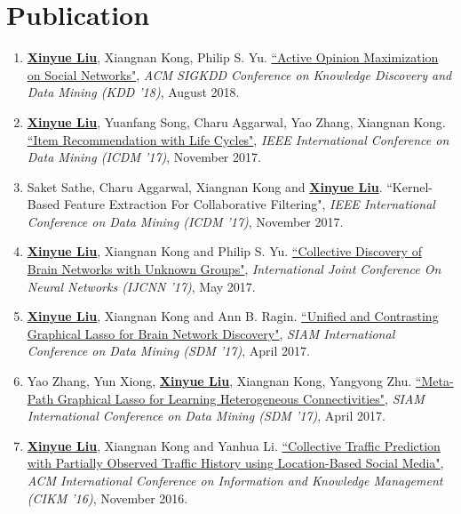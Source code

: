 \documentclass[a4paper,10pt]{article} %
\begin{document}
\section{Publication}
\begin{enumerate}[label=(C\arabic*).]
	\item \label{kdd18} \textbf{\underline{Xinyue Liu}}, Xiangnan Kong, Philip S. Yu. 
	\href{http://cinv.ro/files/KDD18.pdf}
	{``Active Opinion Maximization on Social Networks"}, 
	\emph{ACM SIGKDD Conference on Knowledge Discovery and Data Mining (KDD '18)}, August 2018.
	                    
	\item \label{icdm17a} \textbf{\underline{Xinyue Liu}}, Yuanfang Song, Charu Aggarwal, Yao Zhang, Xiangnan Kong. 
	\href{http://cinv.ro/files/ICDM17.pdf}
	{``Item Recommendation with Life Cycles"}, 
    \emph{IEEE International Conference on Data Mining (ICDM '17)}, November 2017.                 
	
	\item \label{icdm17b} Saket Sathe, Charu Aggarwal, Xiangnan Kong and \textbf{\underline{Xinyue Liu}}. 
	 ``Kernel-Based Feature Extraction For Collaborative Filtering", 
	 \emph{IEEE International Conference on Data Mining (ICDM '17)}, November 2017.
	                      
	\item \label{ijcnn17} \textbf{\underline{Xinyue Liu}}, Xiangnan Kong and Philip S. Yu. 
	 \href{http://cinv.ro/files/IJCNN17.pdf}
	 {``Collective Discovery of Brain Networks with Unknown Groups"}, 
	 \emph{International Joint Conference On Neural Networks (IJCNN '17)}, May 2017.
	                      	
	\item \label{sdm17a} \textbf{\underline{Xinyue Liu}}, Xiangnan Kong and Ann B. Ragin. 
	 \href{http://cinv.ro/files/SDM17.pdf}
	 {``Unified and Contrasting Graphical Lasso for Brain Network Discovery"}, 
	 \emph{SIAM International Conference on Data Mining (SDM '17)}, April 2017.
	                     
	\item \label{sdm17b} Yao Zhang, Yun Xiong, \textbf{\underline{Xinyue Liu}}, Xiangnan Kong, Yangyong Zhu. 
	 \href{http://cinv.ro/files/SDM17_Yao.pdf}
	 {``Meta-Path Graphical Lasso for Learning Heterogeneous Connectivities"}, 
	 \emph{SIAM International Conference on Data Mining (SDM '17)}, April 2017.
	                     
	\item  \label{cikm16} 
    \textbf{\underline{Xinyue Liu}}, Xiangnan Kong and Yanhua Li. 
	 \href{http://cinv.ro/files/CIKM16.pdf}
	 {``Collective Traffic Prediction with Partially Observed Traffic History using Location-Based Social Media"}, 
	 \emph{ACM International Conference on Information and Knowledge Management (CIKM '16)}, November 2016.
	                     

\end{enumerate}
\end{document}
